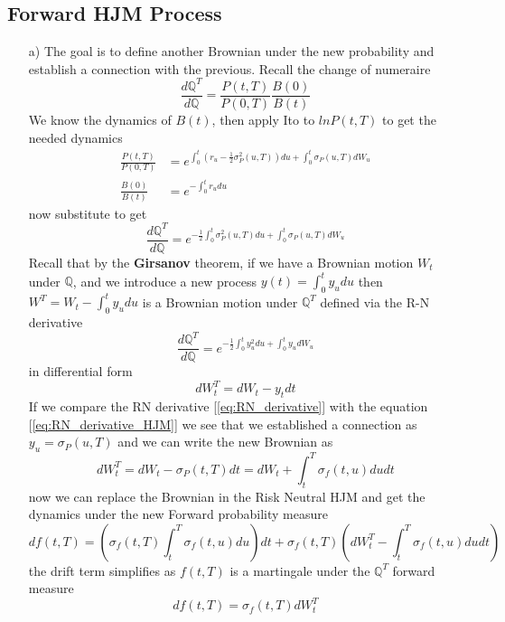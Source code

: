 \documentclass{article}
\begin{document}
\subsection{Forward HJM Process}
\begin{itemize}
    \item[a)] The goal is to define another Brownian under the new probability and establish a connection with the previous. Recall the change of numeraire
\begin{equation*}
    \frac{d \mathbb{Q}^T}{d \mathbb{Q}} = \frac{P(t,T)}{P(0,T)} \frac{B(0)}{B(t)}
\end{equation*}
We know the dynamics of $B(t)$, then apply Ito to $ln P(t,T)$ to get the needed dynamics
\begin{align*}
    \frac{P(t,T)}{P(0,T)} &= e^{\int_0^t (r_u - \frac{1}{2}\sigma_P^2(u,T))du + \int_0^t \sigma_P(u,T)dW_u} \\
    \frac{B(0)}{B(t)} &= e^{-\int_0^t r_u du}
\end{align*}
now substitute to get 
\begin{equation}\label{eq:RN_derivative_HJM}
     \frac{d \mathbb{Q}^T}{d \mathbb{Q}} = e^{- \frac{1}{2} \int_0^t \sigma_P^2(u,T)du + \int_0^t \sigma_P(u,T)dW_u}
\end{equation}
Recall that by the \textbf{Girsanov} theorem, if we have a Brownian motion $W_t$ under $\mathbb{Q}$, and we introduce a new process $y(t) = \int_0^t y_u du$ then $W^T = W_t - \int_0^t y_u du$ is a Brownian motion under $\mathbb{Q}^T$ defined via the R-N derivative
\begin{equation}\label{eq:RN_derivative}
    \frac{d \mathbb{Q}^T}{d \mathbb{Q}} = e^{-\frac{1}{2} \int_0^t y_u^2 du + \int_0^t y_u dW_u}
\end{equation}
in differential form
\begin{equation*}
    dW_t^T = dW_t - y_t dt
\end{equation*}
If we compare the RN derivative [\ref{eq:RN_derivative}] with the equation [\ref{eq:RN_derivative_HJM}] we see that we established a connection as  $y_u = \sigma_P(u,T)$ and we can write the new Brownian as
\begin{equation*}
    dW_t^T = dW_t - \sigma_P(t,T)dt = dW_t + \int_t^T \sigma_f(t,u)du dt
\end{equation*}
now we can replace the Brownian in the Risk Neutral HJM and get the dynamics under the new Forward probability measure
\begin{equation*}
        df(t,T) = \left( \sigma_f(t,T) \int_t^T  \sigma_f(t,u) du \right) dt + \sigma_f(t,T) \left( dW_t^T - \int_t^T \sigma_f(t,u)du dt \right)
\end{equation*}
the drift term simplifies as $f(t,T)$ is a martingale under the $ \mathbb{Q}^T$ forward measure
\begin{equation*}\label{eq:FWD_HJM}
        df(t,T) =  \sigma_f(t,T) dW_t^T 
\end{equation*}


\end{itemize}
\end{document}
